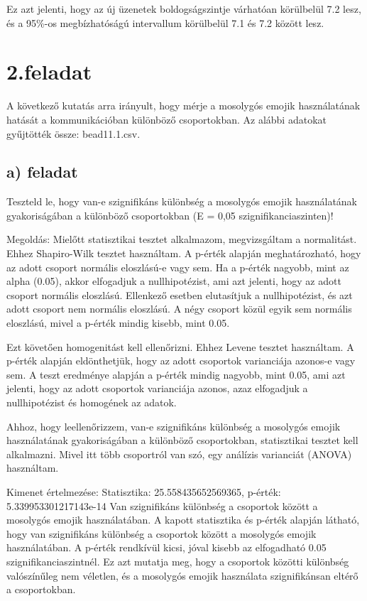 \documentclass[11pt,a4paper,oneside]{report}
\begin{document}
Ez azt jelenti, hogy az új üzenetek boldogságszintje várhatóan körülbelül 7.2 lesz,
és a 95\%-os megbízhatóságú intervallum körülbelül 7.1 és 7.2 között lesz.



\chapter{2.feladat}
A következő kutatás arra irányult, hogy mérje a mosolygós emojik használatának hatását a kommunikációban különböző csoportokban. Az alábbi adatokat gyűjtötték  össze: bead11.1.csv.

\section{a) feladat}
Teszteld le, hogy van-e szignifikáns különbség a mosolygós emojik használatának gyakoriságában a különböző csoportokban (E = 0,05 szignifikanciaszinten)!

Megoldás:
Mielőtt statisztikai tesztet alkalmazom, megvizsgáltam a normalitást.
Ehhez Shapiro-Wilk tesztet használtam. A p-érték alapján meghatározható, hogy az adott csoport normális eloszlású-e vagy sem.
Ha a p-érték nagyobb, mint az alpha (0.05), akkor elfogadjuk a nullhipotézist, ami azt jelenti, hogy az adott csoport normális eloszlású.
Ellenkező esetben elutasítjuk a nullhipotézist, és azt adott csoport nem normális eloszlású. A négy csoport közül egyik sem normális eloszlású, mivel a p-érték mindig kisebb, mint 0.05.

Ezt követően homogenitást kell ellenőrizni. Ehhez Levene tesztet használtam. A p-érték alapján eldönthetjük, hogy az adott csoportok varianciája azonos-e vagy sem.
A teszt eredménye alapján a p-érték mindig nagyobb, mint 0.05, ami azt jelenti, hogy az adott csoportok varianciája azonos, azaz elfogadjuk a nullhipotézist és homogének az adatok.

Ahhoz, hogy leellenőrizzem, van-e szignifikáns különbség a mosolygós emojik használatának gyakoriságában a különböző csoportokban, statisztikai tesztet kell alkalmazni.
Mivel itt több csoportról van szó, egy análízis varianciát (ANOVA) használtam.

Kimenet értelmezése:
Statisztika: 25.558435652569365, p-érték: 5.339953301217143e-14
Van szignifikáns különbség a csoportok között a mosolygós emojik használatában.
A kapott statisztika és p-érték alapján látható, hogy van szignifikáns különbség a csoportok között a mosolygós emojik használatában. A p-érték rendkívül kicsi, jóval kisebb az elfogadható 0.05 szignifikanciaszintnél. Ez azt mutatja meg, hogy a csoportok közötti különbség valószínűleg nem véletlen, és a mosolygós emojik használata szignifikánsan eltérő a csoportokban.
\end{document}
